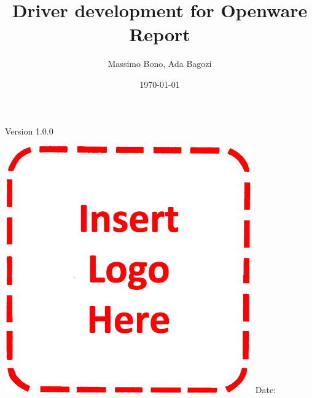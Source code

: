 \documentclass[oneside]{book}
\title{Driver development for Openware Report}
\author{Massimo Bono, Ada Bagozi}
\date{\today}
\begin{document}
\begin{titlepage}
    \centering
    \vfill
    {\bfseries\Large
        \makeatletter\@title\makeatother
        
        \vskip2cm

        \makeatletter\@author\makeatother
        
        \vskip2cm

        Version 1.0.0
        \\
    }    
    \vfill
    \includegraphics[width=0.8\textwidth]{src/images/logo}
    \vfill
    \vfill
    Date: \makeatletter\@date\makeatother
\end{titlepage}
\clearpage

\frontmatter

\tableofcontents
\clearpage

\listoffigures
\clearpage

 
\listoftables
\clearpage

\printglossary[type=\acronymtype]
\clearpage



\mainmatter


\clearpage


\backmatter

\printglossary[type={terms}]
\clearpage
\backmatter


\end{document}
